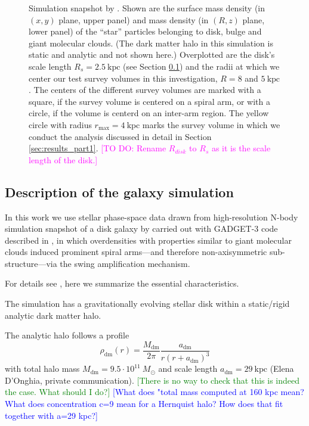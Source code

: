 \documentclass[iop,revtex4,numberedappendix,appendixfloats]{emulateapj}
\newcommand{\Wilma}[1]{\textcolor{Magenta}{#1}}
\newcommand{\HW}[1]{\textcolor{Green}{#1}}
\newcommand{\Jo}[1]{\textcolor{Blue}{#1}}
\begin{document}
\begin{figure}[!htbp]
\caption{Simulation snapshot by \citet{2013ApJ...766...34D} . Shown are the surface mass density (in $(x,y)$ plane, upper panel) and mass density (in $(R,z)$ plane, lower panel) of the ``star'' particles belonging to disk, bulge and giant molecular clouds. (The dark matter halo in this simulation is static and analytic and not shown here.) Overplotted are the disk's scale length $R_s=2.5~\text{kpc}$ (see Section \ref{sec:simulation_description}) and the radii at which we center our test survey volumes in this investigation, $R=8$ and $5~\text{kpc}$. The centers of the different survey volumes are marked with a square, if the survey volume is centered on a spiral arm, or with a circle, if the volume is centerd on an inter-arm region. The yellow circle with radius $r_\text{max}=4~\text{kpc}$ marks the survey volume in which we conduct the analysis discussed in detail in Section \ref{sec:results_part1}. \Wilma{[TO DO: Rename $R_{disk}$ to $R_s$ as it is the scale length of the disk.]}}
\label{fig:simulation}
\end{figure}

\subsection{Description of the galaxy simulation} \label{sec:simulation_description}

In this work we use stellar phase-space data drawn from high-resolution N-body simulation snapshot of a disk galaxy by \citet{2013ApJ...766...34D} carried out with GADGET-3 code described in \citet{2005MNRAS.361..776S}, in which overdensities with properties similar to giant molecular clouds induced prominent spiral arms---and therefore non-axisymmetric sub-structure---via the swing amplification mechanism. 

For details see \citet{2013ApJ...766...34D}, here we summarize the essential characteristics.

The simulation has a gravitationally evolving stellar disk within a static/rigid analytic dark matter halo.

The analytic halo follows a \citet{1990ApJ...356..359H} profile
\begin{equation}
\rho_\text{dm}(r) = \frac{M_\text{dm}}{2\pi} \frac{a_\text{dm}}{r (r+a_\text{dm})^3} \label{eq:dm_hernquist}
\end{equation}
with total halo mass $M_\text{dm} = 9.5\cdot 10^{11} ~M_\odot$ and scale length $a_\text{dm} = 29~\text{kpc}$ (Elena D'Onghia, private communication). \HW{[There is no way to check that this is indeed the case. What should I do?]} \Jo{[What does "total mass computed at 160 kpc mean? What does concentration c=9 mean for a Hernquist halo? How does that fit together with a=29 kpc?]}
\end{document}

